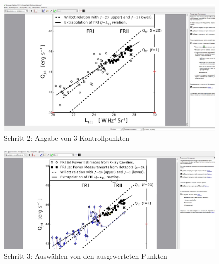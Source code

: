 \documentclass[11pt,
               a4paper,
               parskip=half, style=authoryear, citestyle=authoryear-comp
              bibliography=totoc,
               ]{scrartcl}
\begin{document}
\begin{figure}
    \centering
    \includegraphics[scale=0.35]{shag2.jpg}
    \caption{Schritt 2: Angabe von 3 Kontrollpunkten}
    \label{fig:my_label}
\end{figure}

\begin{figure}
    \centering
    \includegraphics[scale=0.35]{shag3.jpg}
    \caption{Schritt 3: Auswählen von den ausgewerteten Punkten}
    \label{fig:my_label}
\end{figure}
\end{document}
